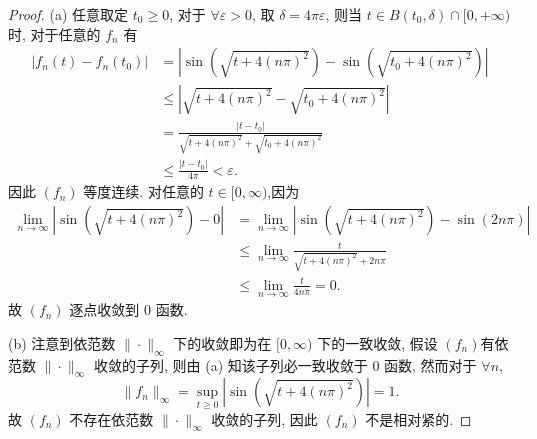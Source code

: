 \begin{proof}
    (a) 任意取定 $t_0\geq 0$, 对于 $\forall\varepsilon>0$,
    取 $\delta=4\pi\varepsilon$, 则当 $t\in B(t_0,\delta)\cap [0,+\infty)$ 时, 对于任意的 $f_n$ 有
    \begin{align*}
        |f_n(t)-f_n(t_0)| & =\left|\sin(\sqrt{t+4(n\pi)^2})-\sin(\sqrt{t_0+4(n\pi)^2})\right| \\
                        & \leq |\sqrt{t+4(n\pi)^2}-\sqrt{t_0+4(n\pi)^2}|\\
                        & =\frac{|t-t_0|}{\sqrt{t+4(n\pi)^2}+\sqrt{t_0+4(n\pi)^2}}\\
                        & \leq\frac{|t-t_0|}{4\pi}<\varepsilon.
    \end{align*}
    因此 $(f_n)$ 等度连续.
    对任意的 $t\in [0,\infty)$,因为
    \[\begin{split}
    \lim_{n\to\infty}|\sin(\sqrt{t+4(n\pi)^2})-0|&=\lim_{n\to\infty}|\sin(\sqrt{t+4(n\pi)^2})-\sin(2n\pi)|\\
    &\leq \lim_{n\to\infty}\frac{t}{\sqrt{t+4(n\pi)^2}+2n\pi}\\
    &\leq \lim_{n\to\infty}\frac{t}{4n\pi}=0.
    \end{split}\]
    故 $(f_n)$ 逐点收敛到 $0$ 函数.

    (b) 注意到依范数 $\|\cdot\|_{\infty}$ 下的收敛即为在 $[0,\infty)$ 下的一致收敛,
    假设 $(f_n)$有依范数 $\|\cdot\|_{\infty}$ 收敛的子列, 则由 (a) 知该子列必一致收敛于 $0$ 函数,
    然而对于 $\forall n$,
    \[\|f_n\|_{\infty}=\sup_{t\geq 0}|\sin(\sqrt{t+4(n\pi)^2})|=1.\]
    故 $(f_n)$ 不存在依范数 $\|\cdot\|_{\infty}$ 收敛的子列, 因此 $(f_n)$ 不是相对紧的.
\end{proof}




